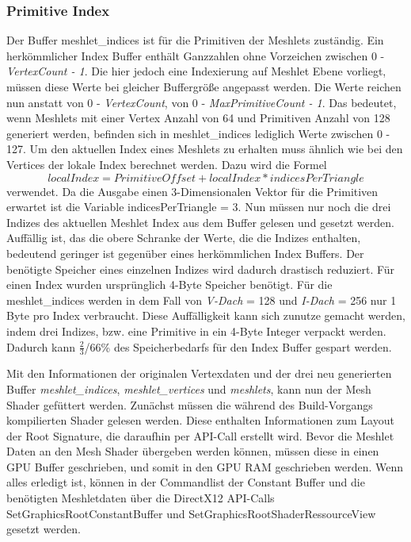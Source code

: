\subsubsection*{Primitive Index}
Der Buffer meshlet\_indices ist für die Primitiven der Meshlets zuständig.
Ein herkömmlicher Index Buffer enthält Ganzzahlen ohne Vorzeichen zwischen 0 - \textit{VertexCount - 1}.
Die hier jedoch eine Indexierung auf Meshlet Ebene vorliegt, müssen diese Werte bei gleicher Buffergröße angepasst werden.
Die Werte reichen nun anstatt von 0 - \textit{VertexCount}, von 0 - \textit{MaxPrimitiveCount - 1}.
Das bedeutet, wenn Meshlets mit einer Vertex Anzahl von 64 und Primitiven Anzahl von 128 generiert werden, befinden sich in meshlet\_indices lediglich Werte zwischen 0 - 127.
Um den aktuellen Index eines Meshlets zu erhalten muss ähnlich wie bei den Vertices der lokale Index berechnet werden.
Dazu wird die Formel
\begin{equation*}
localIndex = PrimitiveOffset + localIndex * indicesPerTriangle
\end{equation*}
verwendet.
Da die Ausgabe einen 3-Dimensionalen Vektor für die Primitiven erwartet ist die Variable indicesPerTriangle = 3.
Nun müssen nur noch die drei Indizes des aktuellen Meshlet Index aus dem Buffer gelesen und gesetzt werden.
\newline
Auffällig ist, das die obere Schranke der Werte, die die Indizes enthalten, bedeutend geringer ist gegenüber eines herkömmlichen Index Buffers.
Der benötigte Speicher eines einzelnen Indizes wird dadurch drastisch reduziert.
Für einen Index wurden ursprünglich 4-Byte Speicher benötigt.
Für die meshlet\_indices werden in dem Fall von \textit{V-Dach} = 128 und \textit{I-Dach} = 256 nur 1 Byte pro Index verbraucht.
Diese Auffälligkeit kann sich zunutze gemacht werden, indem drei Indizes, bzw. eine Primitive in ein 4-Byte Integer verpackt werden.
Dadurch kann $\frac{2}{3}$/66\% des Speicherbedarfs für den Index Buffer gespart werden.

Mit den Informationen der originalen Vertexdaten und der drei neu generierten Buffer \textit{meshlet\_indices}, \textit{meshlet\_vertices} und \textit{meshlets}, kann nun der Mesh Shader gefüttert werden.
Zunächst müssen die während des Build-Vorgangs kompilierten Shader gelesen werden.
Diese enthalten Informationen zum Layout der Root Signature, die daraufhin per API-Call erstellt wird.
Bevor die Meshlet Daten an den Mesh Shader übergeben werden können, müssen diese in einen GPU Buffer geschrieben, und somit in den GPU RAM geschrieben werden.
Wenn alles erledigt ist, können in der Commandlist der Constant Buffer und die benötigten Meshletdaten über die DirectX12 API-Calls SetGraphicsRootConstantBuffer und SetGraphicsRootShaderRessourceView gesetzt werden.

